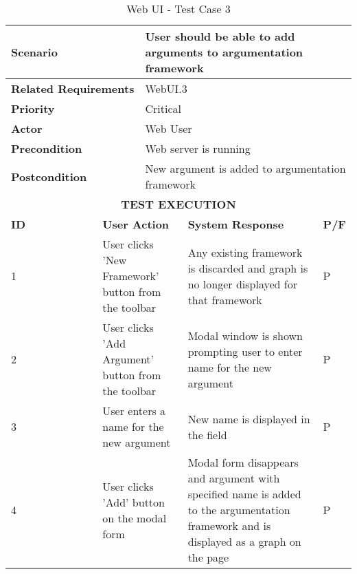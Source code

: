 \begin{longtable}[c]{p{}|p{}|p{}|p{}|p{}}
	\caption{Web UI - Test Case 3}
	\label{table:testcase3} \\
	\hline
	\multicolumn{2}{p{0.3\textwidth}}{\textbf{Scenario}} & \multicolumn{3}{p{0.6\textwidth}}{User should be able to add arguments to argumentation framework} \\ 
	\hline
	\endfirsthead
	\endhead
	\multicolumn{2}{p{0.3\textwidth}}{\textbf{Related Requirements}} & \multicolumn{3}{p{0.6\textwidth}}{WebUI.3} \\ 
	\hline
	\multicolumn{2}{p{0.3\textwidth}}{\textbf{Priority}} & \multicolumn{3}{p{0.6\textwidth}}{Critical} \\ 
	\hline
	\multicolumn{2}{p{0.3\textwidth}}{\textbf{Actor}} & \multicolumn{3}{p{0.6\textwidth}}{Web User} \\ 
	\hline
	\multicolumn{2}{p{0.3\textwidth}}{\textbf{Precondition}} & \multicolumn{3}{p{0.6\textwidth}}{Web server is running} \\ 
	\hline
	\multicolumn{2}{p{0.3\textwidth}}{\textbf{Postcondition}} & \multicolumn{3}{p{0.6\textwidth}}{New argument is added to argumentation framework} \\ 
	\hline
	\multicolumn{5}{c}{\cellcolor{grey}\textbf{TEST EXECUTION}} \\ 
	\hline
	\textbf{ID} & \multicolumn{2}{|p{0.4\textwidth}|}{\textbf{User Action}} & \textbf{System Response} & \textbf{P/F} \\ 
	\hline
	1 & \multicolumn{2}{|p{0.4\textwidth}|}{User clicks 'New Framework' button from the toolbar} & Any existing framework is discarded and graph is no longer displayed for that framework & P \\ 
	\hline
	2 & \multicolumn{2}{|p{0.4\textwidth}|}{User clicks 'Add Argument' button from the toolbar} & Modal window is shown prompting user to enter name for the new argument & P \\ 
	\hline
	3 & \multicolumn{2}{|p{0.4\textwidth}|}{User enters a name for the new argument} & New name is displayed in the field & P \\ 
	\hline
	4 & \multicolumn{2}{|p{0.4\textwidth}|}{User clicks 'Add' button on the modal form} & Modal form disappears and argument with specified name is added to the argumentation framework and is displayed as a graph on the page & P \\ 
	\hline
\end{longtable}

